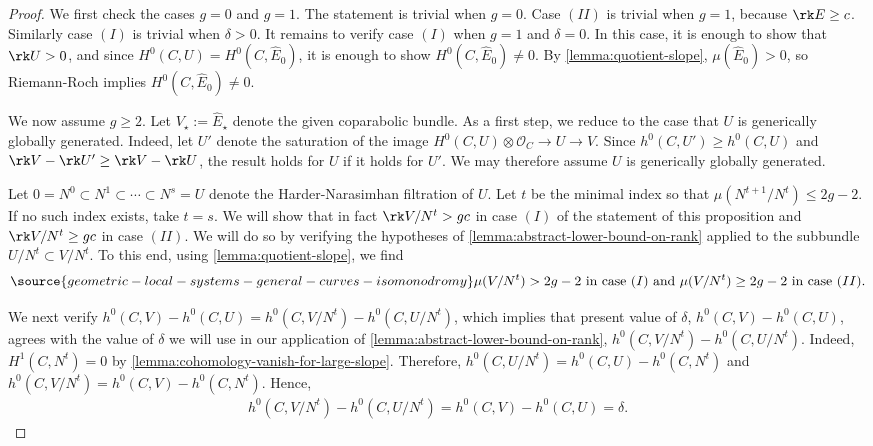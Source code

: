 \begin{proof}
	We first check the cases $g = 0$ and $g = 1$.
	The statement is trivial when $g = 0$.
	Case $(II)$ is trivial when $g = 1$, because
	$\rk E \geq c$. Similarly case $(I)$ is trivial when $\delta >
	0$.
	It remains to verify case $(I)$ when $g = 1$ and $\delta = 0$.
	In this case, it is enough to show that $\rk U > 0$,
	and since $H^0(C, U) = H^0(C, \widehat{E}_0)$,
	it is enough to show
	$H^0(C, \widehat{E}_0)\neq 0$.
	By \autoref{lemma:quotient-slope}, $\mu(\widehat{E}_0) > 0$,
	so Riemann-Roch implies $H^0(C, \widehat{E}_0) \neq 0$.

	We now assume $g \geq 2$.
	Let $V_\star := \widehat{E}_\star$ denote the given coparabolic bundle.
	As a first step, we reduce to the case that $U$ is generically globally
	generated.
	Indeed, let $U'$ denote the saturation of the image
	$H^0(C, U) \otimes \mathscr O_C \to U \to V$.
	Since $h^0(C, U') \geq h^0(C, U)$ and $\rk V -
	\rk U' \geq \rk V - \rk U$, the result holds for $U$ if it holds for
	$U'$.
	We may therefore assume $U$ is generically globally generated.

	Let $0=N^0 \subset N^1 \subset \cdots \subset N^s = U$ denote the
	Harder-Narasimhan filtration of $U$.
	Let $t$ be the minimal index so that $\mu(N^{t+1}/N^{t}) \leq 2g-2$.
	If no such index exists, take $t = s$.
	We will show that in fact $\rk V/N^t > gc$ in case $(I)$ of the statement
	of this proposition
	and $\rk V/N^t \geq gc$ in case $(II)$.
	We will do so by verifying the hypotheses of
	\autoref{lemma:abstract-lower-bound-on-rank} applied to the subbundle
	$U/N^t \subset V/N^t$.
	To this end, using \autoref{lemma:quotient-slope},
	we find
	\begin{align}
		\label{equation:quotient-slope-bound}
\source{geometric-local-systems-general-curves-isomonodromy}
		\mu(V/N^t) > 2g - 2 \text{ in case $(I)$ and }
	\mu(V/N^t) \geq 2g - 2 \text{ in case $(II)$.}
	\end{align}

	We next verify
	$h^0(C, V)- h^0(C, U) = h^0(C,V/N^t) - h^0(C, U/N^t)$,
which implies that present value of $\delta$, $h^0(C, V)- h^0(C, U)$, agrees with the value of $\delta$ we will use
in our application of \autoref{lemma:abstract-lower-bound-on-rank},
	$h^0(C,V/N^t) - h^0(C, U/N^t)$.
	Indeed, $H^1(C, N^t) = 0$ by
	\autoref{lemma:cohomology-vanish-for-large-slope}.
	Therefore,
	$h^0(C, U/N^t) = h^0(C, U) - h^0(C, N^t)$ and
	$h^0(C, V/N^t) = h^0(C, V) - h^0(C, N^t)$.
	Hence,
	\begin{align*}
		h^0(C, V/N^t)- h^0(C,U/N^t) = h^0(C, V) - h^0(C, U) = \delta.
	\end{align*}


\end{proof}
